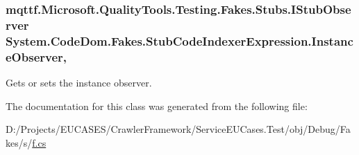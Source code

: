 \hypertarget{class_system_1_1_code_dom_1_1_fakes_1_1_stub_code_indexer_expression_a3c9ef34cca9012835deb2d64ac290529}{
\subsubsection[{Instance\-Observer}]{\setlength{\rightskip}{0pt plus 5cm}mqttf.\-Microsoft.\-Quality\-Tools.\-Testing.\-Fakes.\-Stubs.\-I\-Stub\-Observer System.\-Code\-Dom.\-Fakes.\-Stub\-Code\-Indexer\-Expression.\-Instance\-Observer\hspace{0.3cm}{\ttfamily [get]}, {\ttfamily [set]}}}\label{class_system_1_1_code_dom_1_1_fakes_1_1_stub_code_indexer_expression_a3c9ef34cca9012835deb2d64ac290529}


Gets or sets the instance observer.



The documentation for this class was generated from the following file\-:\begin{DoxyCompactItemize}
\item 
D\-:/\-Projects/\-E\-U\-C\-A\-S\-E\-S/\-Crawler\-Framework/\-Service\-E\-U\-Cases.\-Test/obj/\-Debug/\-Fakes/s/\hyperlink{s_2f_8cs}{f.\-cs}\end{DoxyCompactItemize}
